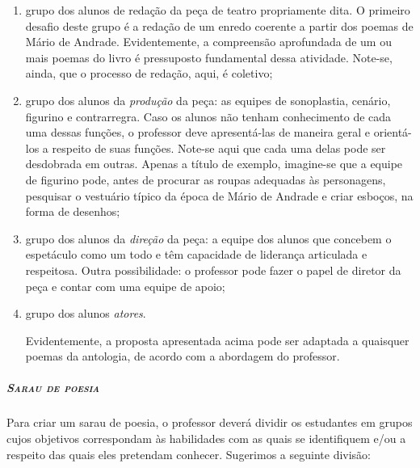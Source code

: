 \documentclass[11pt]{extarticle}
\begin{document}
\begin{enumerate}
 
\item grupo dos alunos de redação da peça de teatro propriamente dita. O
primeiro desafio deste grupo é a redação de um enredo coerente a partir
dos poemas de Mário de Andrade. Evidentemente, a compreensão aprofundada
de um ou mais poemas do livro é pressuposto fundamental dessa atividade.
Note-se, ainda, que o processo de redação, aqui, é coletivo;

\item grupo dos alunos da \emph{produção} da peça: as equipes de
sonoplastia, cenário, figurino e contrarregra. Caso os alunos não tenham
conhecimento de cada uma dessas funções, o professor deve apresentá-las
de maneira geral e orientá-los a respeito de suas funções. Note-se aqui
que cada uma delas pode ser desdobrada em outras. Apenas a título de
exemplo, imagine-se que a equipe de figurino pode, antes de procurar as
roupas adequadas às personagens, pesquisar o vestuário típico da época
de Mário de Andrade e criar esboços, na forma de desenhos;

\item grupo dos alunos da \emph{direção} da peça: a equipe dos alunos que
concebem o espetáculo como um todo e têm capacidade de liderança
articulada e respeitosa. Outra possibilidade: o professor pode fazer o
papel de diretor da peça e contar com uma equipe de apoio;

\item grupo dos alunos \emph{atores}.

Evidentemente, a proposta apresentada acima pode ser adaptada a
quaisquer poemas da antologia, de acordo com a abordagem do professor.
\end{enumerate}

\subparagraph{\textsc{Sarau de poesia}}

Para criar um sarau de poesia, o professor deverá dividir os
estudantes em grupos cujos objetivos correspondam às habilidades com as
quais se identifiquem e/ou a respeito das quais eles pretendam conhecer.
Sugerimos a seguinte divisão:
\end{document}
